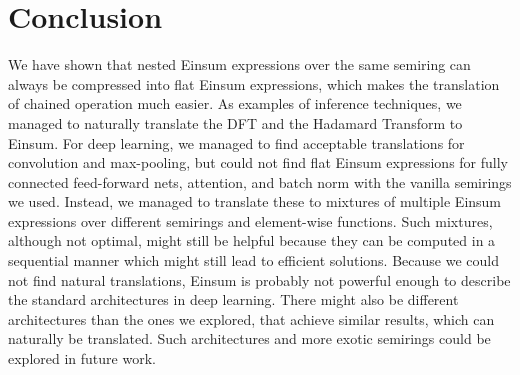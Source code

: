 \chapter{Conclusion}


We have shown that nested Einsum expressions over the same semiring can always be compressed into flat Einsum expressions, which makes the translation of chained operation much easier.
As examples of inference techniques, we managed to naturally translate the DFT and the Hadamard Transform to Einsum.
For deep learning, we managed to find acceptable translations for convolution and max-pooling,
but could not find flat Einsum expressions for fully connected feed-forward nets, attention, and batch norm with the vanilla semirings we used.
Instead, we managed to translate these to mixtures of multiple Einsum expressions over different semirings and element-wise functions.
Such mixtures, although not optimal, might still be helpful because they can be computed in a sequential manner which might still lead to efficient solutions.
Because we could not find natural translations, Einsum is probably not powerful enough to describe the standard architectures in deep learning.
There might also be different architectures than the ones we explored, that achieve similar results, which can naturally be translated.
Such architectures and more exotic semirings could be explored in future work.

